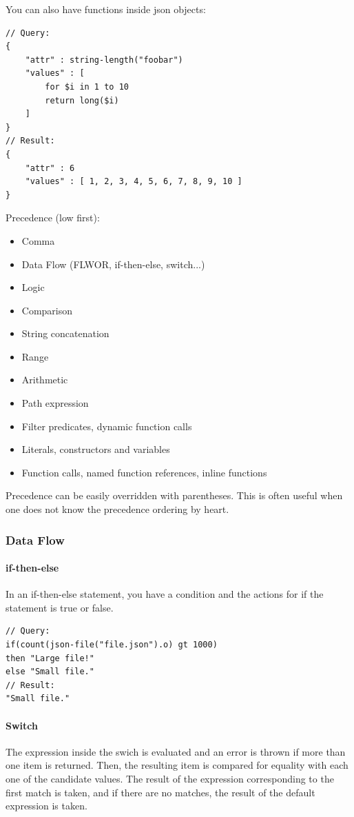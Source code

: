 You can also have functions inside json objects:
\begin{lstlisting}[style=json]
// Query:
{
    "attr" : string-length("foobar")
    "values" : [
        for $i in 1 to 10
        return long($i)
    ]
}
// Result:
{
    "attr" : 6
    "values" : [ 1, 2, 3, 4, 5, 6, 7, 8, 9, 10 ]
}
\end{lstlisting}

Precedence (low first):
\begin{itemize}
    \item Comma
    \item Data Flow (FLWOR, if-then-else, switch...)
    \item Logic
    \item Comparison
    \item String concatenation
    \item Range
    \item Arithmetic
    \item Path expression
    \item Filter predicates, dynamic function calls
    \item Literals, constructors and variables
    \item Function calls, named function references, inline functions
\end{itemize}

Precedence can be easily overridden with parentheses. This is often useful when one does not know the precedence ordering by heart.


\subsubsection{Data Flow}

\paragraph{if-then-else}
In an if-then-else statement, you have a condition and the actions for if the statement is true or false.

\begin{lstlisting}[style=json]
// Query:
if(count(json-file("file.json").o) gt 1000)
then "Large file!"
else "Small file."
// Result:
"Small file."
\end{lstlisting}

\paragraph{Switch}
The expression inside the swich is evaluated and an error is thrown if more than one item is returned. Then, the resulting item is compared for equality with each one of the candidate values. The result of the expression corresponding to the first match is taken, and if there are no matches, the result of the default expression is taken.

